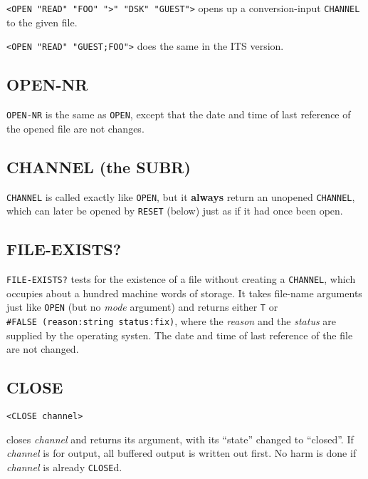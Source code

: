 \documentclass[a4paper]{scrbook}
\begin{document}
\texttt{\textless{}OPEN\ "READ"\ "FOO"\ "\textgreater{}"\ "DSK"\ "GUEST"\textgreater{}} opens up a conversion-input
\texttt{CHANNEL} to the given file.

\texttt{\textless{}OPEN\ "READ"\ "GUEST;FOO"\textgreater{}} does the same in the ITS version.

\subsection{OPEN-NR}\label{open-nr}

\texttt{OPEN-NR}  is the same as \texttt{OPEN}, except that the date and time of last
reference of the opened file are not changes.

\subsection{CHANNEL (the SUBR)}\label{channel-the-subr}

\texttt{CHANNEL}  is called exactly like \texttt{OPEN}, but it \textbf{always} return an
unopened \texttt{CHANNEL}, which can later be opened by \texttt{RESET}  (below) just as if it had
once been open.

\subsection{FILE-EXISTS?}\label{file-exists}

\texttt{FILE-EXISTS?}  tests for the existence of a file without creating a
\texttt{CHANNEL}, which occupies about a hundred machine words of storage. It takes file-name arguments just like
\texttt{OPEN} (but no \emph{mode} argument) and returns either \texttt{T} or \texttt{\#FALSE\ (reason:string\ status:fix)},
where the \emph{reason} and the \emph{status} are supplied by the operating systen. The date and time of last reference of
the file are not changed.

\subsection{CLOSE}\label{close}

\begin{verbatim}
<CLOSE channel>
\end{verbatim}

 closes \emph{channel} and returns its argument, with its ``state'' changed to ``closed''. If
\emph{channel} is for output, all buffered output is written out first. No harm is done if \emph{channel} is already
\texttt{CLOSE}d.
\end{document}
